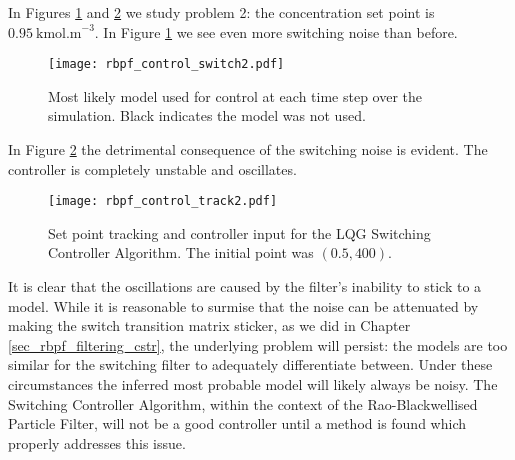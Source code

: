 In Figures \ref{fig_rbpf_control_switch2} and \ref{fig_rbpf_control_track2} we study problem 2: the concentration set point is $0.95~\text{kmol.m}^{-3}$. In Figure \ref{fig_rbpf_control_switch2} we see even more switching noise than before.
\begin{figure}[H] 
\centering
\texttt{[image: rbpf\_control\_switch2.pdf]}
\caption{Most likely model used for control at each time step over the simulation. Black indicates the model was not used.}
\label{fig_rbpf_control_switch2}
\end{figure}
In Figure \ref{fig_rbpf_control_track2} the detrimental consequence of the switching noise is evident. The controller is completely unstable and oscillates.
\begin{figure}[H] 
\centering
\texttt{[image: rbpf\_control\_track2.pdf]}
\caption{Set point tracking and controller input for the LQG Switching Controller Algorithm. The initial point was $(0.5, 400)$.}
\label{fig_rbpf_control_track2}
\end{figure}
It is clear that the oscillations are caused by the filter's inability to stick to a model. While it is reasonable to surmise that the noise can be attenuated by making the switch transition matrix sticker, as we did in Chapter \ref{sec_rbpf_filtering_cstr}, the underlying problem will persist: the models are too similar for the switching filter to adequately differentiate between. Under these circumstances the inferred most probable model will likely always be noisy. The Switching Controller Algorithm, within the context of the Rao-Blackwellised Particle Filter, will not be a good controller until a method is found which properly addresses this issue.

